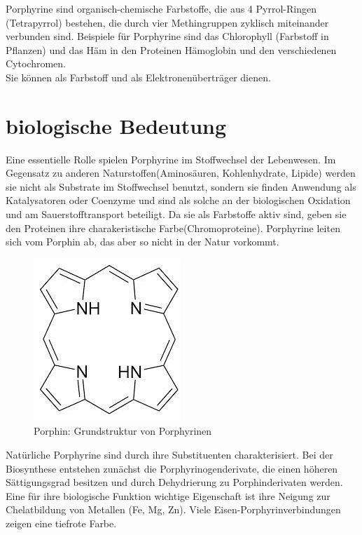 Porphyrine sind organisch-chemische Farbstoffe, die aus 4 Pyrrol-Ringen (Tetrapyrrol) bestehen, die durch vier Methingruppen zyklisch miteinander verbunden sind. Beispiele für Porphyrine sind das Chlorophyll (Farbstoff in Pflanzen) und das Häm in den Proteinen Hämoglobin und den verschiedenen Cytochromen.
\\Sie können als Farbstoff und als Elektronenüberträger dienen.
\section{biologische Bedeutung}
Eine essentielle Rolle spielen Porphyrine im Stoffwechsel der Lebenwesen. Im Gegensatz zu anderen Naturstoffen(Aminosäuren, Kohlenhydrate, Lipide) werden sie nicht als Substrate im Stoffwechsel benutzt, sondern sie finden Anwendung als Katalysatoren oder Coenzyme und sind als solche an der biologischen Oxidation und am Sauerstofftransport beteiligt. Da sie als Farbstoffe aktiv sind, geben sie den Proteinen ihre charakeristische Farbe(Chromoproteine). Porphyrine leiten sich vom Porphin ab, das aber so nicht in der Natur vorkommt.
\begin{figure}[!htpb]
\centering
\includegraphics[scale=0.5]{graphics/porphin}
\caption{Porphin: Grundstruktur von Porphyrinen}
\end{figure}
Natürliche Porphyrine sind durch ihre Substituenten charakterisiert. Bei der Biosynthese entstehen zunächst die Porphyrinogenderivate, die einen höheren Sättigungsgrad besitzen und durch Dehydrierung zu Porphinderivaten werden. Eine für ihre biologische Funktion wichtige Eigenschaft ist ihre Neigung zur Chelatbildung von Metallen (Fe, Mg, Zn). Viele Eisen-Porphyrinverbindungen zeigen eine tiefrote Farbe.\cite{[8]}
